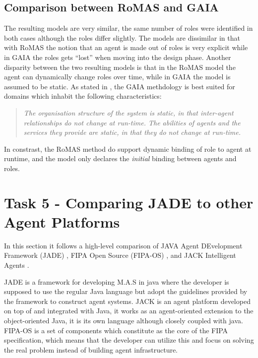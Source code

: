 \documentclass[paper=letter, fontsize=12pt]{article}
\begin{document}
\subsection{Comparison between RoMAS and GAIA}
The resulting models are very similar, the same number of roles were identified in both cases although the roles differ slightly. The models are dissimilar in that with RoMAS the notion that an agent is made out of roles is very explicit while in GAIA the roles gets ``lost'' when moving into the design phase. Another disparity between the two resulting models is that in the RoMAS model the agent can dynamically change roles over time, while in GAIA the model is assumed to be static. As stated in \citep{wooldrigde_jennings}, the GAIA methdology is best suited for domains which inhabit the following characteristics:
\begin{quote}
\textit{The organisation structure of the system is static, in that inter-agent relationships do not change at run-time. The abilities of agents and the services they provide are static, in that they do not change at run-time.}\citep{wooldrigde_jennings}
\end{quote}
In constrast, the RoMAS method do support dynamic binding of role to agent at runtime, and the model only declares the \textit{initial} binding between agents and roles.
\section{Task 5 - Comparing JADE to other Agent Platforms}
In this section it follows a high-level comparison of JAVA Agent DEvelopment Framework (JADE) \citep{jade}, FIPA Open Source (FIPA-OS) \citep{fipaos}, and JACK Intelligent Agents \citep{jack}. 

JADE is a framework for developing M.A.S in java where the developer is supposed to use the regular Java language but adopt the guidelines provided by the framework to construct agent systems. JACK is an agent platform developed on top of and integrated with Java, it works as an agent-oriented extension to the object-oriented Java, it is its own language although closely coupled with java. FIPA-OS is a set of components which constitute as the core of the FIPA specification, which means that the developer can utilize this and focus on solving the real problem instead of building agent infrastructure.
\end{document}
